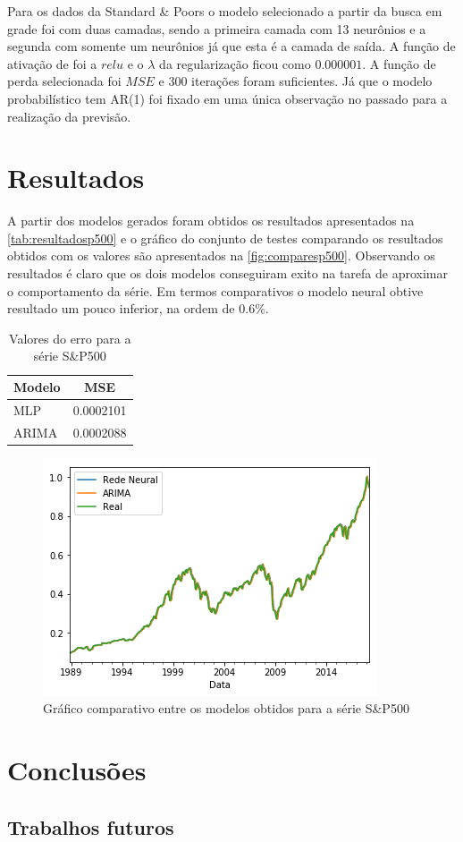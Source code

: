 \documentclass[
    12pt,
    oneside,
    a4paper,
    english,
    brazil
]{abntex2}
\begin{document}
Para os dados  da Standard \& Poors  o modelo selecionado a partir  da busca em
grade  foi com  duas camadas,  sendo a  primeira camada  com 13  neurônios e  a
segunda com somente um  neurônios já que esta é a camada de  saída. A função de
ativação de foi a $relu$ e  o $\lambda$ da regularização ficou como $0.000001$.
A função de  perda selecionada foi $MSE$ e 300  iterações foram suficientes. Já
que  o modelo  probabilístico  tem AR(1)  foi fixado  em  uma única  observação
no passado para a realização da previsão.

\chapter{Resultados}\label{chap:result}

A  partir  dos  modelos  gerados   foram  obtidos  os  resultados  apresentados
na   \autoref{tab:resultadosp500}   e  o   gráfico   do   conjunto  de   testes
comparando  os   resultados  obtidos  com   os  valores  são   apresentados  na
\autoref{fig:comparesp500}.  Observando  os  resultados  é claro  que  os  dois
modelos conseguiram exito  na tarefa de aproximar o comportamento  da série. Em
termos  comparativos o  modelo neural  obtive resultado  um pouco  inferior, na
ordem de $0.6\%$.

\begin{table}[ht]
    \centering
    \caption{Valores do erro para a série S\&P500}\label{tab:resultadosp500}
    \begin{tabular}{ll}
        \multicolumn{1}{c}{Modelo} & \multicolumn{1}{c}{MSE} \\
        \toprule
        MLP                        & 0.0002101               \\
        ARIMA                      & 0.0002088
    \end{tabular}
\end{table}

\begin{figure}[ht]
    \centering
    \caption{Gráfico comparativo entre os modelos obtidos para a série
    S\&P500}\label{fig:comparesp500}
    \includegraphics[width=.5\linewidth]{images/sp500_prediction_compare.png}
\end{figure}

\chapter{Conclusões}\label{chap:concl}

\section{Trabalhos futuros}

\postextual


\end{document}
